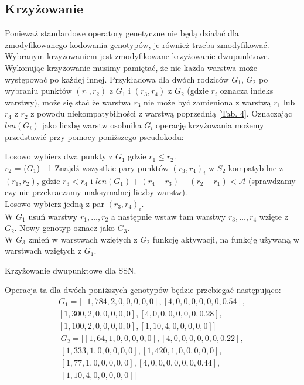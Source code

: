 \documentclass{article}
\begin{document}
\subsection{Krzyżowanie}
Ponieważ standardowe operatory genetyczne nie będą działać dla zmodyfikowanego kodowania
genotypów, je również trzeba zmodyfikować. Wybranym krzyżowaniem jest zmodyfikowane krzyżowanie
dwupunktowe. Wykonując krzyżowanie musimy pamiętać, że nie każda warstwa może występować po 
każdej innej. Przykładowa dla dwóch rodziców $G_1$, $G_2$ po wybraniu punktów $(r_1, r_2)$ z 
$G_1$ i $(r_3, r_4)$ z $G_2$ (gdzie $r_i$ oznacza indeks warstwy), może się stać że warstwa
$r_3$ nie może być zamieniona z warstwą $r_1$ lub $r_4$ z $r_2$ z powodu niekompatybilności
z warstwą poprzednią [\hyperref[tab:rules]{Tab. 4}]. Oznaczając $len(G_i)$ jako liczbę warstw
osobnika $G_i$ operację krzyżowania możemy przedstawić przy pomocy poniższego pseudokodu:
\cite{ams} \\
\begin{algorithm}[H]
	Losowo wybierz dwa punkty z $G_1$ gdzie $r_1 \leq r_2$.\\
	 {
		$r_2$ = ($G_1$) - 1
	}
	Znajdź wszystkie pary punktów $(r_3, r_4)_i$ w $S_2$ kompatybilne z $(r_1, r_2)$,
	gdzie $r_3 < r_4$ i $len(G_1) + (r_4 - r_3) - (r_2 - r_1) < \mathcal{A}$
	(sprawdzamy czy nie przekraczamy maksymalnej liczby warstw).\\
	Losowo wybierz jedną z par $(r_3, r_4)_i$.\\
	W $G_1$ usuń warstwy $r_1, \ldots, r_2$ a następnie wstaw tam
	warstwy $r_3, \ldots, r_4$ wzięte z $G_2$. Nowy genotyp oznacz jako $G_3$.\\
	W $G_3$ zmień w warstwach wziętych z $G_2$ funkcję aktywacji, na funkcję 
	używaną w warstwach wziętych z  $G_1$.
	\caption{Krzyżowanie dwupunktowe dla SSN.}
\end{algorithm}
Operacja ta dla dwóch poniższych genotypów będzie przebiegać następująco:\\
\begin{align*}
	G_1 = \big[[1, 784, 2, 0, 0, 0, 0, 0], [4, 0, 0, 0, 0, 0, 0, 0.54],\\ 
	            [1, 300, 2, 0, 0, 0, 0, 0], [4, 0, 0, 0, 0, 0, 0, 0.28],\\
		    [1, 100, 2, 0, 0, 0, 0, 0], [1, 10, 4, 0, 0, 0, 0, 0]\big]
\end{align*}
\begin{align*}
	G_2 = \big[[1, 64, 1, 0, 0, 0, 0, 0], [4, 0, 0, 0, 0, 0, 0, 0.22],\\
		    [1, 333, 1, 0, 0, 0, 0, 0], [1, 420, 1, 0, 0, 0, 0, 0],\\
		    [1, 77, 1, 0, 0, 0, 0, 0], [4, 0, 0, 0, 0, 0, 0, 0.44],\\
		    [1, 10, 4, 0, 0, 0, 0, 0]\big]
\end{align*}
\end{document}
